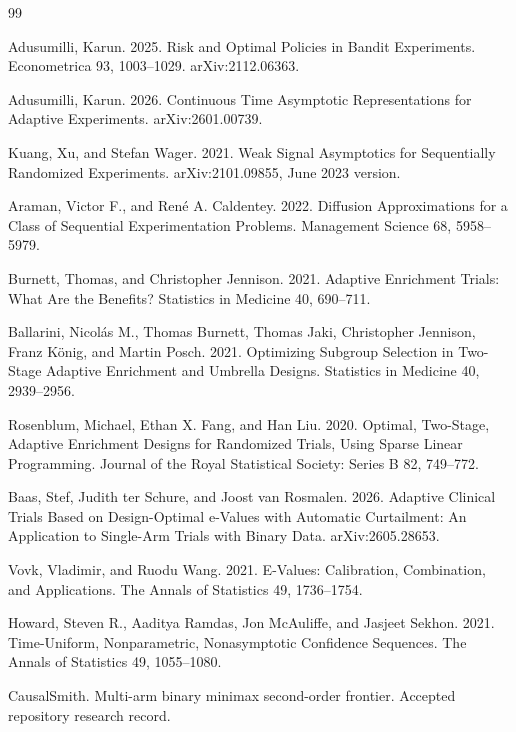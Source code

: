 \documentclass{article}
\begin{document}
\begin{thebibliography}{99}

   Adusumilli, Karun. 2025. Risk and Optimal Policies in Bandit Experiments. Econometrica 93, 1003--1029. arXiv:2112.06363.

   Adusumilli, Karun. 2026. Continuous Time Asymptotic Representations for Adaptive Experiments. arXiv:2601.00739.

   Kuang, Xu, and Stefan Wager. 2021. Weak Signal Asymptotics for Sequentially Randomized Experiments. arXiv:2101.09855, June 2023 version.

   Araman, Victor F., and René A. Caldentey. 2022. Diffusion Approximations for a Class of Sequential Experimentation Problems. Management Science 68, 5958--5979.

   Burnett, Thomas, and Christopher Jennison. 2021. Adaptive Enrichment Trials: What Are the Benefits? Statistics in Medicine 40, 690--711.

   Ballarini, Nicolás M., Thomas Burnett, Thomas Jaki, Christopher Jennison, Franz König, and Martin Posch. 2021. Optimizing Subgroup Selection in Two-Stage Adaptive Enrichment and Umbrella Designs. Statistics in Medicine 40, 2939--2956.

   Rosenblum, Michael, Ethan X. Fang, and Han Liu. 2020. Optimal, Two-Stage, Adaptive Enrichment Designs for Randomized Trials, Using Sparse Linear Programming. Journal of the Royal Statistical Society: Series B 82, 749--772.

   Baas, Stef, Judith ter Schure, and Joost van Rosmalen. 2026. Adaptive Clinical Trials Based on Design-Optimal e-Values with Automatic Curtailment: An Application to Single-Arm Trials with Binary Data. arXiv:2605.28653.

   Vovk, Vladimir, and Ruodu Wang. 2021. E-Values: Calibration, Combination, and Applications. The Annals of Statistics 49, 1736--1754.

   Howard, Steven R., Aaditya Ramdas, Jon McAuliffe, and Jasjeet Sekhon. 2021. Time-Uniform, Nonparametric, Nonasymptotic Confidence Sequences. The Annals of Statistics 49, 1055--1080.

   CausalSmith. Multi-arm binary minimax second-order frontier. Accepted repository research record.

\end{thebibliography}
\end{document}
